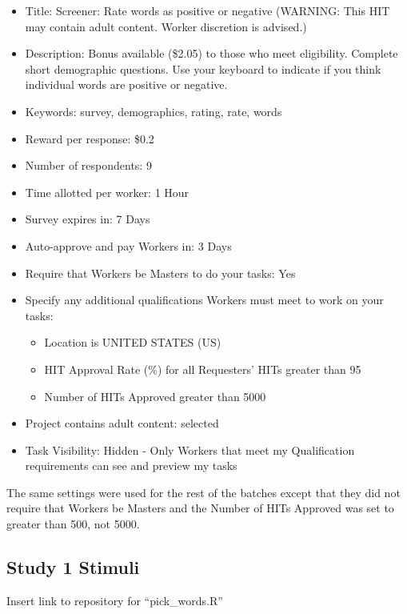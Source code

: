 \documentclass[man]{apa6}
\providecommand{\tightlist}{%
  \setlength{\itemsep}{0pt}\setlength{\parskip}{0pt}}
\begin{document}
\begin{itemize}
\tightlist
\item
  Title: Screener: Rate words as positive or negative (WARNING: This HIT may contain adult content. Worker discretion is advised.)\\
\item
  Description: Bonus available (\$2.05) to those who meet eligibility. Complete short demographic questions. Use your keyboard to indicate if you think individual words are positive or negative.
\item
  Keywords: survey, demographics, rating, rate, words
\item
  Reward per response: \$0.2
\item
  Number of respondents: 9
\item
  Time allotted per worker: 1 Hour
\item
  Survey expires in: 7 Days
\item
  Auto-approve and pay Workers in: 3 Days
\item
  Require that Workers be Masters to do your tasks: Yes
\item
  Specify any additional qualifications Workers must meet to work on your tasks:

  \begin{itemize}
  \tightlist
  \item
    Location is UNITED STATES (US)
  \item
    HIT Approval Rate (\%) for all Requesters' HITs greater than 95
  \item
    Number of HITs Approved greater than 5000
  \end{itemize}
\item
  Project contains adult content: selected
\item
  Task Visibility: Hidden - Only Workers that meet my Qualification requirements can see and preview my tasks
\end{itemize}

The same settings were used for the rest of the batches except that they did not require that Workers be Masters and the Number of HITs Approved was set to greater than 500, not 5000.

\hypertarget{study-1-stimuli}{%
\subsection{Study 1 Stimuli}\label{study-1-stimuli}}

Insert link to repository for \enquote{pick\_words.R}
\end{document}
